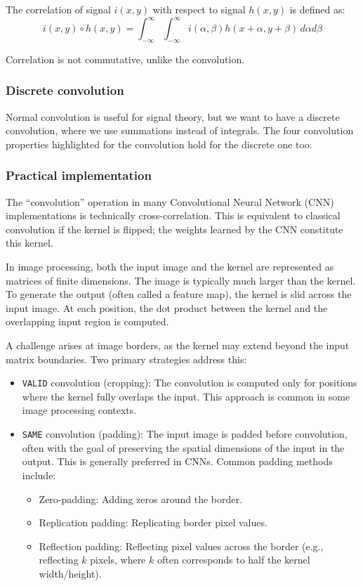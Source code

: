The correlation of signal $i(x,y)$  with respect to signal $h(x,y)$ is defined as:
$$i(x,y) \circ h(x,y) = \int_{-\infty}^{\infty} \int_{-\infty}^{\infty} i(\alpha, \beta) h(x+\alpha, y+\beta) \, d\alpha  d\beta $$

Correlation is not commutative, unlike the convolution.

\subsubsection{Discrete convolution}

Normal convolution is useful for signal theory, but we want to have a discrete convolution, where we use summations instead of integrals.
The four convolution properties highlighted for the convolution hold for the discrete one too.

\subsubsection{Practical implementation}
The ``convolution'' operation in many Convolutional Neural Network (CNN) implementations is technically cross-correlation. This is equivalent to classical convolution if the kernel is flipped; the weights learned by the CNN constitute this kernel.

In image processing, both the input image and the kernel are represented as matrices of finite dimensions. The image is typically much larger than the kernel.
To generate the output (often called a feature map), the kernel is slid across the input image. At each position, the dot product between the kernel and the overlapping input region is computed.

A challenge arises at image borders, as the kernel may extend beyond the input matrix boundaries.
Two primary strategies address this:
\begin{itemize}
  \item \texttt{VALID} convolution (cropping): The convolution is computed only for positions where the kernel fully overlaps the input. This approach is common in some image processing contexts.
  \item \texttt{SAME} convolution (padding): The input image is padded before convolution, often with the goal of preserving the spatial dimensions of the input in the output. This is generally preferred in CNNs. Common padding methods include:
    \begin{itemize}
        \item Zero-padding: Adding zeros around the border.
        \item Replication padding: Replicating border pixel values.
        \item Reflection padding: Reflecting pixel values across the border (e.g., reflecting $k$ pixels, where $k$ often corresponds to half the kernel width/height).
    \end{itemize}
\end{itemize}

